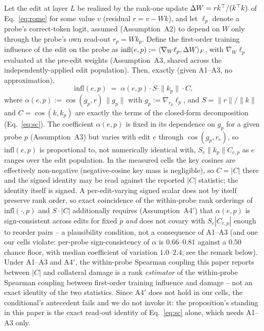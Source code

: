 \iftnnls
\begin{proposition}
\label{prop:sxc-gradsim}
Let the edit at layer $L$ be realized by the rank-one update $\Delta W = rk^{\top}/(k^{\top}k)$
of Eq.~\ref{eq:rome} for some value $v$ (residual $r=v-Wk$), and let $\ell_p$ denote a
probe's correct-token logit, assumed (Assumption~A2) to depend on $W$ only through the
probe's own read-out $r_p=Wk_p$. Define the first-order training influence of the edit on
the probe as $\mathrm{infl}(e,p):=\langle\nabla_W\ell_p,\Delta W\rangle_F$, with $\nabla_W\ell_p$
evaluated at the pre-edit weights (Assumption~A3, shared across the independently-applied
edit population). Then, exactly (given A1--A3, no approximation),
\[
\mathrm{infl}(e,p) \;=\; \alpha(e,p)\cdot S\cdot\|k_p\|\cdot C,
\]
where $\alpha(e,p) := \cos(g_p, r)\,\|g_p\|$ with $g_p:=\nabla_{r_p}\ell_p$,
and $S=\|r\|/\|k\|$ and $C=\cos(k,k_p)$ are exactly the terms of the closed-form
decomposition (Eq.~\ref{eq:sc}). The coefficient $\alpha(e,p)$ is fixed in its dependence
on $g_p$ for a given probe $p$ (Assumption~A3) but varies with edit $e$ through
$\cos(g_p,r_e)$, so $\mathrm{infl}(e,p)$ is proportional to, not numerically identical
with, $S_e\|k_p\|C_{e,p}$ as $e$ ranges over the edit population.
In the measured cells the key cosines are effectively non-negative
(negative-cosine key mass is negligible), so $C = |C|$ there and the signed
identity may be read against the reported $|C|$ statistic; the identity
itself is signed. A per-edit-varying
signed scalar does not by itself preserve rank order, so exact coincidence of the
within-probe rank orderings of $\mathrm{infl}(\cdot,p)$ and $S\cdot|C|$ additionally
requires (Assumption~A4$'$) that $\alpha(e,p)$ is sign-consistent across edits for fixed
$p$ \emph{and} does not covary with $S_e|C_{e,p}|$ enough to reorder pairs -- a
plausibility condition, not a consequence of A1--A3 (and one our cells violate:
per-probe sign-consistency of $\alpha$ is $0.66$--$0.81$ against a $0.50$ chance
floor, with median coefficient of variation $1.0$--$2.4$; see the remark below). Under A1--A3 and A4$'$, the
within-probe Spearman coupling this paper reports between $|C|$ and collateral damage is
a rank \emph{estimator} of the within-probe Spearman coupling between first-order
training influence and damage -- not an exact identity of the two statistics.
Since A4$'$ does not hold in our cells, the conditional's antecedent fails and we
do not invoke it: the proposition's standing in this paper is the exact
read-out identity of Eq.~\ref{eq:sc} alone, which needs A1--A3 only.
\end{proposition}
